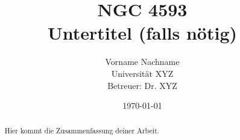 \documentclass[a4paper,12pt]{report}
\title{\textbf{NGC 4593} \\ \Large Untertitel (falls nötig)}
\author{Vorname Nachname \\ Universität XYZ \\ Betreuer: Dr. XYZ}
\date{\today}
\begin{document}
	
	\maketitle
	\thispagestyle{empty}
	\newpage
	
	\begin{abstract}
		Hier kommt die Zusammenfassung deiner Arbeit.
	\end{abstract}
	\newpage
	
	\tableofcontents
	\newpage
	
	\listoffigures
	\listoftables
	\newpage
	
	
	
	
	
	
	\printbibliography
	
	\appendix
	
	
\end{document}

